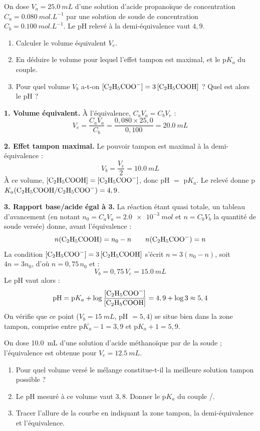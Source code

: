 \documentclass[11pt]{article}
\begin{document}
\begin{exoresolu}
On dose $V_a = \SI{25,0}{mL}$ d'une solution d'acide propanoïque  de concentration $C_a = \SI{0,080}{mol.L^{-1}}$ par une solution de soude de concentration $C_b = \SI{0,100}{mol.L^{-1}}$. Le pH relevé à la demi-équivalence vaut $4,9$.
\begin{enumerate}
\item Calculer le volume équivalent $V_e$.
\item En déduire le volume pour lequel l'effet tampon est maximal, et le p$K_a$ du couple.
\item Pour quel volume $V_b$ a-t-on $[\ce{C2H5COO-}] = 3\,[\ce{C2H5COOH}]$ ? Quel est alors le pH ?
\end{enumerate}
\tcblower
\textbf{1. Volume équivalent.} À l'équivalence, $C_a V_a = C_b V_e$ :
\[ V_e = \frac{C_a V_a}{C_b} = \frac{0,080 \times 25,0}{0,100} = \SI{20,0}{mL} \]

\textbf{2. Effet tampon maximal.} Le pouvoir tampon est maximal à la demi-équivalence :
\[ V_b = \frac{V_e}{2} = \SI{10,0}{mL} \]
À ce volume, $[\ce{C2H5COOH}] = [\ce{C2H5COO-}]$, donc pH $=$ p$K_a$. Le relevé donne p$K_a(\ce{C2H5COOH}/\ce{C2H5COO-}) = 4,9$.

\textbf{3. Rapport base/acide égal à 3.} La réaction  étant quasi totale, un tableau d'avancement (en notant $n_0 = C_a V_a = \SI{2,0e-3}{mol}$ et $n = C_b V_b$ la quantité de soude versée) donne, avant l'équivalence :
\[ n(\ce{C2H5COOH}) = n_0 - n \qquad n(\ce{C2H5COO-}) = n \]
La condition $[\ce{C2H5COO-}] = 3\,[\ce{C2H5COOH}]$ s'écrit $n = 3(n_0 - n)$, soit $4n = 3n_0$, d'où $n = 0,75\,n_0$ et :
\[ V_b = 0,75\,V_e = \SI{15,0}{mL} \]
Le pH vaut alors :
\[ \text{pH} = \text{p}K_a + \log\frac{[\ce{C2H5COO-}]}{[\ce{C2H5COOH}]} = 4,9 + \log 3 \approx 5,4 \]
On vérifie que ce point ($V_b = \SI{15}{mL}$, pH $= 5,4$) se situe bien dans la zone tampon, comprise entre p$K_a - 1 = 3,9$ et p$K_a + 1 = 5,9$.
\end{exoresolu}

\begin{exercice}
On dose \SI{10,0}{mL} d'une solution d'acide méthanoïque  par de la soude ; l'équivalence est obtenue pour $V_e = \SI{12,5}{mL}$.
\begin{enumerate}
\item Pour quel volume versé le mélange constitue-t-il la meilleure solution tampon possible ?
\item Le pH mesuré à ce volume vaut $3,8$. Donner le p$K_a$ du couple /.
\item Tracer l'allure de la courbe en indiquant la zone tampon, la demi-équivalence et l'équivalence.
\end{enumerate}
\end{exercice}
\end{document}
